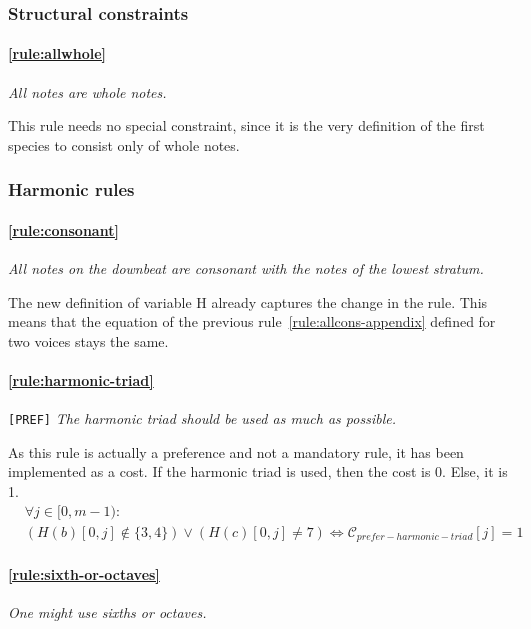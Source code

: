 \subsubsection{Structural constraints}
    \paragraph{\hspace{0.6cm}\ref{rule:allwhole}} \textit{All notes are whole notes.}
    
    This rule needs no special constraint, since it is the very definition of the first species to consist only of whole notes.

\subsubsection{Harmonic rules}
\paragraph{\hspace{.6cm}\ref{rule:consonant}} \greendots \textit{All notes on the downbeat are consonant with the notes of the lowest stratum.}
    
    The new definition of variable H already captures the change in the rule. This means that the equation of the previous rule~\ref{rule:allcons-appendix} defined for two voices stays the same.
    \paragraph{\hspace{.6cm}\ref{rule:harmonic-triad}} \texttt{[PREF]} \textit{The harmonic triad should be used as much as possible.}
    
    As this rule is actually a preference and not a mandatory rule, it has been implemented as a cost. If the harmonic triad is used, then the cost is 0. Else, it is 1.
    \begin{equation}
    \begin{aligned}
    &\forall j \in [0, m-1) \colon \\
    &(H(b)[0,j] \notin \{3, 4\}) \lor (H(c)[0, j]  \neq 7) \iff \mathcal{C}_{\mathit{prefer-harmonic-triad}}[j] = 1
    \end{aligned}
    \end{equation}

    \paragraph{\hspace{.6cm}\ref{rule:sixth-or-octaves}}  \textit{One might use sixths or octaves.}

